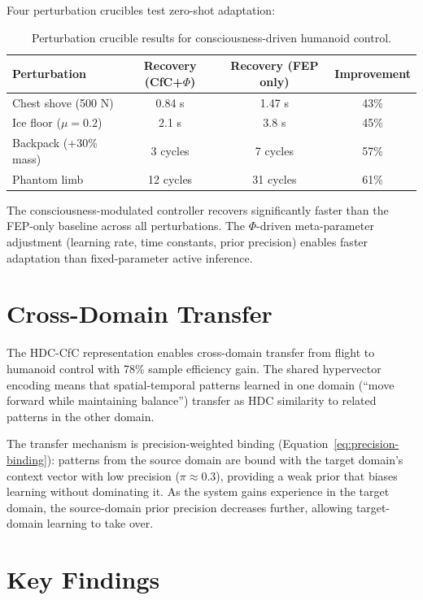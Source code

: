 \documentclass[12pt]{book}
\begin{document}
Four perturbation crucibles test zero-shot adaptation:

\begin{table}[H]
\centering
\caption{Perturbation crucible results for consciousness-driven humanoid control.}
\label{tab:perturbation}
\begin{tabular}{lccc}
\toprule
\textbf{Perturbation} & \textbf{Recovery (CfC+$\Phi$)} & \textbf{Recovery (FEP only)} & \textbf{Improvement} \\
\midrule
Chest shove (500 N) & 0.84 s & 1.47 s & 43\% \\
Ice floor ($\mu = 0.2$) & 2.1 s & 3.8 s & 45\% \\
Backpack (+30\% mass) & 3 cycles & 7 cycles & 57\% \\
Phantom limb & 12 cycles & 31 cycles & 61\% \\
\bottomrule
\end{tabular}
\end{table}

The consciousness-modulated controller recovers significantly faster than the FEP-only baseline across all perturbations. The $\Phi$-driven meta-parameter adjustment (learning rate, time constants, prior precision) enables faster adaptation than fixed-parameter active inference.

\section{Cross-Domain Transfer}

The HDC-CfC representation enables cross-domain transfer from flight to humanoid control with 78\% sample efficiency gain. The shared hypervector encoding means that spatial-temporal patterns learned in one domain (``move forward while maintaining balance'') transfer as HDC similarity to related patterns in the other domain.

The transfer mechanism is precision-weighted binding (Equation~\ref{eq:precision-binding}): patterns from the source domain are bound with the target domain's context vector with low precision ($\pi \approx 0.3$), providing a weak prior that biases learning without dominating it. As the system gains experience in the target domain, the source-domain prior precision decreases further, allowing target-domain learning to take over.

\section{Key Findings}
\end{document}
